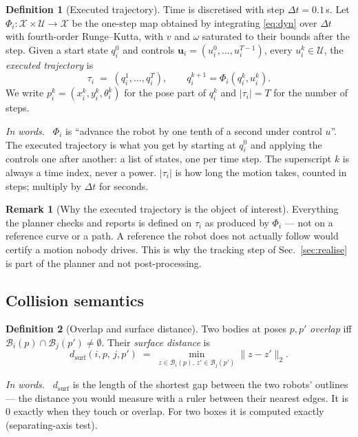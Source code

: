 \documentclass[conference]{IEEEtran}
\theoremstyle{plain}
\theoremstyle{definition}
\newtheorem{definition}{Definition}
\newtheorem{remark}{Remark}
\newcommand{\inwords}{\par\smallskip\noindent\textit{In words.}\ }
\newcommand{\Bod}{\mathcal{B}}
\newcommand{\X}{\mathcal{X}}
\newcommand{\Uc}{\mathcal{U}}
\begin{document}
\begin{definition}[Executed trajectory]
\label{def:exec}
Time is discretised with step $\Delta t = 0.1$\,s. Let $\Phi_i : \X \times \Uc \to \X$ be the
one-step map obtained by integrating \eqref{eq:dyn} over $\Delta t$ with fourth-order
Runge--Kutta, with $v$ and $\omega$ saturated to their bounds after the step. Given a start
state $q_i^0$ and controls $\mathbf{u}_i = (u_i^0,\dots,u_i^{T-1})$, every $u_i^k \in \Uc$,
the \emph{executed trajectory} is
\[
  \tau_i \;=\; (q_i^1, \dots, q_i^T),
  \qquad q_i^{k+1} = \Phi_i(q_i^k, u_i^k).
\]
We write $p_i^k = (x_i^k, y_i^k, \theta_i^k)$ for the pose part of $q_i^k$ and
$|\tau_i| = T$ for the number of steps.
\inwords
$\Phi_i$ is ``advance the robot by one tenth of a second under control $u$''. The executed
trajectory is what you get by starting at $q_i^0$ and applying the controls one after
another: a list of states, one per time step. The superscript $k$ is always a time index,
never a power. $|\tau_i|$ is how long the motion takes, counted in steps; multiply by
$\Delta t$ for seconds.
\end{definition}

\begin{remark}[Why the executed trajectory is the object of interest]
Everything the planner checks and reports is defined on $\tau_i$ as produced by $\Phi_i$
--- not on a reference curve or a path. A reference the robot does not actually follow would
certify a motion nobody drives. This is why the tracking step of Sec.~\ref{sec:realise} is
part of the planner and not post-processing.
\end{remark}

\subsection{Collision semantics}
\label{sec:prelim-collision}

\begin{definition}[Overlap and surface distance]
Two bodies at poses $p, p'$ \emph{overlap} iff $\Bod_i(p) \cap \Bod_j(p') \neq \emptyset$.
Their \emph{surface distance} is
\[
  d_{\text{surf}}(i,p,\,j,p') \;=\;
  \min_{z \in \Bod_i(p),\, z' \in \Bod_j(p')} \lVert z - z' \rVert_2 .
\]
\inwords
$d_{\text{surf}}$ is the length of the shortest gap between the two robots' outlines --- the
distance you would measure with a ruler between their nearest edges. It is $0$ exactly when
they touch or overlap. For two boxes it is computed exactly (separating-axis test).
\end{definition}
\end{document}
